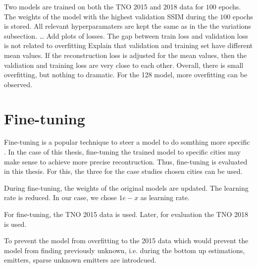 Two models are trained on both the TNO 2015 and 2018 data for $100$ epochs.
The weights of the model with the highest validation SSIM during the $100$ epochs is stored.
All relevant hyperparamaters are kept the same as in the the variations subsection.
\dots
Add plots of losses.
The gap between train loss and validation loss is not related to overfitting
Explain that validation and training set have different mean values.
If the reconstruction loss is adjusted for the mean values, then the valdiation and training loss are very close to each other.
Overall, there is small overfitting, but nothing to dramatic.
For the 128 model, more overfitting can be observed.

\section{Fine-tuning}
Fine-tuning is a popular technique to steer a model to do somthing more specific \cite{FineTuning}.
In the case of this thesis, fine-tuning the trained model to specific cities may make sense to achieve more precise recontruction.
Thus, fine-tuning is evaluated in this thesis.
For this, the three for the case studies chosen cities can be used.

During fine-tuning, the weights of the original models are updated.
The learning rate is reduced.
In our case, we chose $1e-x$ as learning rate.

For fine-tuning, the TNO 2015 data is used.
Later, for evaluation the TNO 2018 is used.

To prevent the model from overfitting to the 2015 data which would prevent the model from finding previously unknown, i.e. during the bottom up estimations, emitters, sparse unknown emitters are introdcued.


